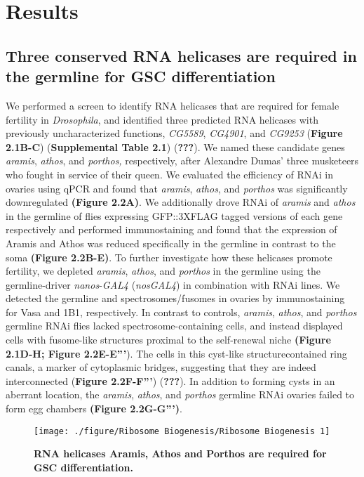 \documentclass[12pt,oneside]{reedthesis}
\begin{document}
\hypertarget{results}{%
\section{Results}\label{results}}

\hypertarget{three-conserved-rna-helicases-are-required-in-the-germline-for-gsc-differentiation}{%
\subsection{Three conserved RNA helicases are required in the germline for GSC differentiation}\label{three-conserved-rna-helicases-are-required-in-the-germline-for-gsc-differentiation}}

We performed a screen to identify RNA helicases that are required for female fertility in \emph{Drosophila}, and identified three predicted RNA helicases with previously uncharacterized functions, \emph{CG5589}, \emph{CG4901}, and \emph{CG9253} (\textbf{Figure 2.1B-C}) (\textbf{Supplemental Table 2.1}) ({\textbf{???}}). We named these candidate genes \emph{aramis}, \emph{athos}, and \emph{porthos,} respectively, after Alexandre Dumas' three musketeers who fought in service of their queen. We evaluated the efficiency of RNAi in ovaries using qPCR and found that \emph{aramis}, \emph{athos}, and \emph{porthos} was significantly downregulated \textbf{(Figure 2.2A)}. We additionally drove RNAi of \emph{aramis} and \emph{athos} in the germline of flies expressing GFP::3XFLAG tagged versions of each gene respectively and performed immunostaining and found that the expression of Aramis and Athos was reduced specifically in the germline in contrast to the soma \textbf{(Figure 2.2B-E)}. To further investigate how these helicases promote fertility, we depleted \emph{aramis}, \emph{athos}, and \emph{porthos} in the germline using the germline-driver \emph{nanos}-\emph{GAL4} (\emph{nosGAL4}) in combination with RNAi lines. We detected the germline and spectrosomes/fusomes in ovaries by immunostaining for Vasa and 1B1, respectively. In contrast to controls, \emph{aramis}, \emph{athos}, and \emph{porthos} germline RNAi flies lacked spectrosome-containing cells, and instead displayed cells with fusome-like structures proximal to the self-renewal niche \textbf{(Figure 2.1D-H; Figure 2.2E-E'''}). The cells in this cyst-like structurecontained ring canals, a marker of cytoplasmic bridges, suggesting that they are indeed interconnected (\textbf{Figure 2.2F-F'''}) ({\textbf{???}}). In addition to forming cysts in an aberrant location, the \emph{aramis}, \emph{athos}, and \emph{porthos} germline RNAi ovaries failed to form egg chambers \textbf{(Figure 2.2G-G''')}.
\begin{figure}

{\centering \texttt{[image: ./figure/Ribosome Biogenesis/Ribosome Biogenesis 1]} 

}

\caption[\textbf{RNA helicases Aramis, Athos and Porthos are required for GSC differentiation.}]{\textbf{RNA helicases Aramis, Athos and Porthos are required for GSC differentiation.}}\label{fig:unnamed-chunk-6}
\end{figure}
\end{document}
